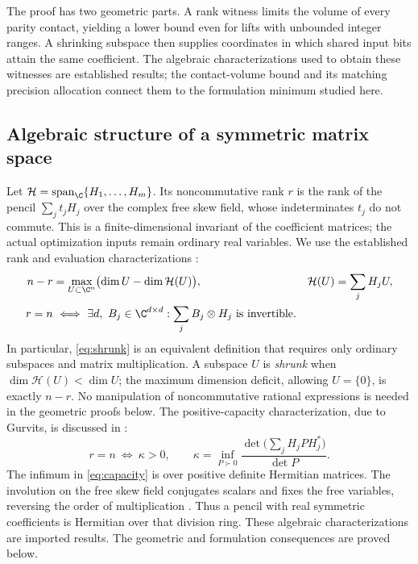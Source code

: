 The proof has two geometric parts. A rank witness limits the volume of
every parity contact, yielding a lower bound even for lifts with
unbounded integer ranges. A shrinking subspace then supplies coordinates
in which shared input bits attain the same coefficient. The algebraic
characterizations used to obtain these witnesses are established results;
the contact-volume bound and its matching precision allocation connect
them to the formulation minimum studied here.

\subsection{Algebraic structure of a symmetric matrix space}

Let $\mathcal H=\operatorname{span}_{\C}\{H_1,\ldots,H_m\}$.
Its noncommutative rank $r$ is the rank of the pencil
$\sum_jt_jH_j$ over the complex free skew field, whose indeterminates
$t_j$ do not commute. This is a finite-dimensional invariant of the
coefficient matrices; the actual optimization inputs remain ordinary
real variables. We use the established rank and evaluation characterizations
\citep[Theorems 1.4 and 1.17]{ggow2020}:
\begin{align}
 n-r&=\max_{U\subset\C^n}
       \bigl(\dim U-\dim\mathcal H(U)\bigr),
 &\mathcal H(U)&=\sum_jH_jU,\label{eq:shrunk}\\
 r=n&\ \Longleftrightarrow\ 
 \exists d,\ B_j\in\C^{d\times d}:
       \sum_j B_j\otimes H_j\text{ is invertible}.\label{eq:evaluation}
\end{align}
In particular, \eqref{eq:shrunk} is an equivalent definition that requires
only ordinary subspaces and matrix multiplication. A subspace $U$ is
\emph{shrunk} when $\dim\mathcal H(U)<\dim U$; the maximum dimension
deficit, allowing $U=\{0\}$, is exactly $n-r$. No manipulation of
noncommutative rational expressions is needed in the geometric proofs below.
The positive-capacity characterization, due to Gurvits, is discussed in
\citet[Section 1.5, concluding discussion on p.~237, and Section 2]{ggow2020}:
\begin{equation}\label{eq:capacity}
 r=n\ \Longleftrightarrow\ \kappa>0,
 \qquad\kappa=\inf_{P\succ0}
 \frac{\det\bigl(\sum_jH_jPH_j^*\bigr)}{\det P}.
\end{equation}
The infimum in \eqref{eq:capacity} is over positive definite Hermitian
matrices. The involution on the free skew field conjugates scalars and
fixes the free variables, reversing the order of multiplication
\citep[Section 2.1]{volcic2021}. Thus a pencil with real symmetric
coefficients is Hermitian over that division ring. These algebraic
characterizations are imported results. The geometric and formulation
consequences are proved below.

